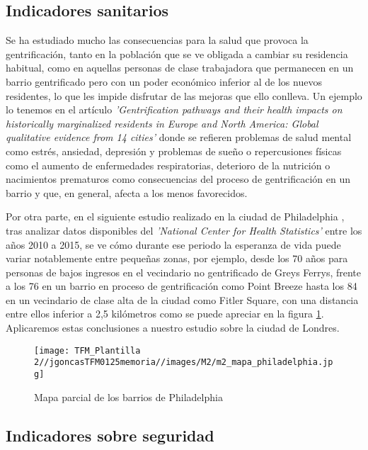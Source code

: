 \documentclass[12pt,a4paper,twoside]{book}
\begin{document}
\subsection{Indicadores sanitarios}

Se ha estudiado mucho las consecuencias para la salud que provoca la gentrificación, tanto en la población que se ve obligada a cambiar su residencia habitual, como en aquellas personas de clase trabajadora que permanecen en un barrio gentrificado pero con un poder económico inferior al de los nuevos residentes, lo que les impide disfrutar de las mejoras que ello conlleva. Un ejemplo lo tenemos en el artículo \textit{'Gentrification pathways and their health impacts on historically marginalized residents in Europe and North America: Global qualitative evidence from 14 cities'} \cite{anguelovski_gentrification_2021} donde se refieren problemas de salud mental como estrés, ansiedad, depresión y problemas de sueño o repercusiones físicas como el aumento de enfermedades respiratorias, deterioro de la nutrición o nacimientos prematuros como consecuencias del proceso de gentrificación en un barrio y que, en general, afecta a los menos favorecidos.

Por otra parte, en el siguiente estudio realizado en la ciudad de Philadelphia \cite{acolin_gentrification_2023}, tras analizar datos disponibles del \textit{'National Center for Health Statistics'} entre los años 2010 a 2015, se ve cómo durante ese periodo la esperanza de vida puede variar notablemente entre pequeñas zonas, por ejemplo, desde los 70 años para personas de bajos ingresos en el vecindario no gentrificado de Greys Ferrys, frente a los 76 en un barrio en proceso de gentrificación como Point Breeze hasta los 84 en un vecindario de clase alta de la ciudad como Fitler Square, con una distancia entre ellos inferior a 2,5 kilómetros como se puede apreciar en la figura \ref{fig:fig_mapa_philadelphia}. Aplicaremos estas conclusiones a nuestro estudio sobre la ciudad de Londres. 

\begin{figure}[h!]
    \centering
    \texttt{[image: TFM\_Plantilla 2//jgoncasTFM0125memoria//images/M2/m2\_mapa\_philadelphia.jpg]}
    \caption{Mapa parcial de los barrios de Philadelphia}
    \label{fig:fig_mapa_philadelphia}
\end{figure}

\subsection{Indicadores sobre seguridad}
\end{document}
